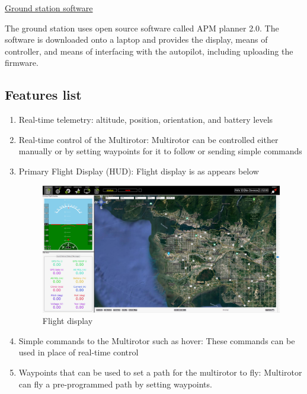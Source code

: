 \underline{Ground station software}

The ground station uses open source software called APM planner 2.0. The software is downloaded onto a laptop and provides the display, means of controller, and means of interfacing with the autopilot, including uploading the firmware.

\subsection{Features list}

\begin{enumerate}

    \item Real-time telemetry: altitude, position, orientation, and battery levels
    
    \item Real-time control of the Multirotor: Multirotor can be controlled either manually or by setting waypoints for it to follow or sending simple commands
    
    \item Primary Flight Display (HUD): Flight display is as appears below
    
\begin{figure}[H]
	\centering
	\includegraphics[width=15cm]{img/HUD.png}
	\caption{Flight display}
	\label{flight display}
	\end{figure}

    \item Simple commands to the Multirotor such as hover: These commands can be used in place of real-time control
    
    \item Waypoints that can be used to set a path for the multirotor to fly: Multirotor can fly a pre-programmed path by setting waypoints.
    
\end{enumerate}

